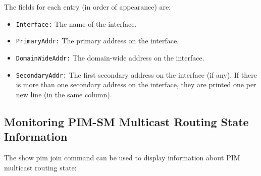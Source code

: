 The fields for each entry (in order of appearance) are:
\begin{itemize}

  \item {\tt Interface:} The name of the interface.

  \item {\tt PrimaryAddr:} The primary address on the interface.

  \item {\tt DomainWideAddr:} The domain-wide address on the interface.

  \item {\tt SecondaryAddr:} The first secondary address on the interface
  (if any). If there is more than one secondary address on the interface,
  they are printed one per new line (in the same column).

\end{itemize}

\subsection{Monitoring PIM-SM Multicast Routing State Information}

The {\stt show pim join} command can be used to display
information about PIM multicast routing state:

